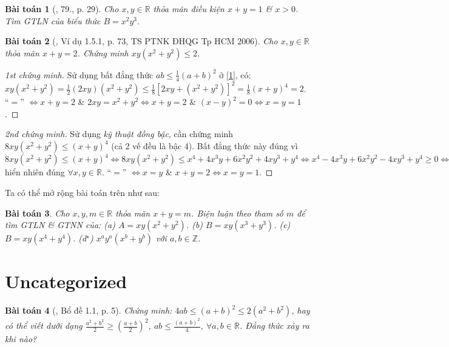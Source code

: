 \documentclass{article}
\newtheorem{baitoan}{Bài toán}
\begin{document}
\begin{baitoan}[\cite{Tuyen_Toan_9}, 79., p. 29]
	Cho $x,y\in\mathbb{R}$ thỏa mãn điều kiện $x + y = 1$ \& $x > 0$. Tìm {\rm GTLN} của biểu thức $B = x^2y^3$.
\end{baitoan}

\begin{baitoan}[\cite{Dung_Can_Anh_BDT_8_9}, Ví dụ 1.5.1, p. 73, TS PTNK ĐHQG Tp HCM 2006]
	Cho $x,y\in\mathbb{R}$ thỏa mãn $x + y = 2$. Chứng minh $xy(x^2 + y^2)\le2$.
\end{baitoan}

\begin{proof}[1st chứng minh]
	Sử dụng bất đẳng thức $ab\le\frac{1}{4}(a + b)^2$ ở \eqref{1}, có: $xy(x^2 + y^2) = \frac{1}{2}(2xy)(x^2 + y^2)\le\frac{1}{8}[2xy + (x^2 + y^2)]^2 = \frac{1}{8}(x + y)^4 = 2$. ``$=$'' $\Leftrightarrow x + y = 2$ \& $2xy = x^2 + y^2\Leftrightarrow x + y = 2$ \& $(x - y)^2 = 0\Leftrightarrow x = y = 1$.
\end{proof}

\begin{proof}[2nd chứng minh]
	Sử dụng \textit{kỹ thuật đồng bậc}, cần chứng minh $8xy(x^2 + y^2)\le(x + y)^4$ (cả 2 vế đều là bậc 4). Bất đẳng thức này đúng vì $8xy(x^2 + y^2)\le(x + y)^4\Leftrightarrow8xy(x^2 + y^2)\le x^4 + 4x^3y + 6x^2y^2 + 4xy^3 + y^4\Leftrightarrow x^4 - 4x^3y + 6x^2y^2 - 4xy^3 + y^4\ge0\Leftrightarrow(x - y)^4\ge0$ hiển nhiên đúng $\forall x,y\in\mathbb{R}$. ``$=$'' $\Leftrightarrow x = y$ \& $x + y = 2\Leftrightarrow x = y = 1$.
\end{proof}
Ta có thể mở rộng bài toán trên như sau:

\begin{baitoan}
	Cho $x,y,m\in\mathbb{R}$ thỏa mãn $x + y = m$. Biện luận theo tham số $m$ để tìm {\rm GTLN} \& {\rm GTNN} của: (a) $A = xy(x^2 + y^2)$. (b) $B = xy(x^3 + y^3)$. (c) $B = xy(x^4 + y^4)$. (d${}^\star$) $x^ay^a(x^b + y^b)$ với $a,b\in\mathbb{Z}$. 
\end{baitoan}


\section{Uncategorized}

\begin{baitoan}[\cite{Son_Nghiep_Trung_Can2021}, Bổ đề 1.1, p. 5]
	Chứng minh: $4ab\le(a + b)^2\le2(a^2 + b^2)$, hay có thể viết dưới dạng $\frac{a^2 + b^2}{2}\ge\left(\frac{a + b}{2}\right)^2$, $ab\le\frac{(a + b)^2}{4}$, $\forall a,b\in\mathbb{R}$. Đẳng thức xảy ra khi nào?
\end{baitoan}
\end{document}
